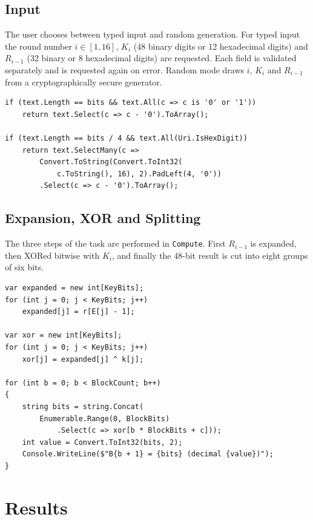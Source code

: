 \documentclass[12pt,a4paper]{article}
\begin{document}
\subsection{Input}

The user chooses between typed input and random generation. For typed input the round number $i\in[1,16]$, $K_i$ (48 binary digits or 12 hexadecimal digits) and $R_{i-1}$ (32 binary or 8 hexadecimal digits) are requested. Each field is validated separately and is requested again on error. Random mode draws $i$, $K_i$ and $R_{i-1}$ from a cryptographically secure generator.

\begin{lstlisting}[style=csharp,caption={Reading bits in binary or hexadecimal form}]
if (text.Length == bits && text.All(c => c is '0' or '1'))
    return text.Select(c => c - '0').ToArray();

if (text.Length == bits / 4 && text.All(Uri.IsHexDigit))
    return text.SelectMany(c =>
        Convert.ToString(Convert.ToInt32(
            c.ToString(), 16), 2).PadLeft(4, '0'))
        .Select(c => c - '0').ToArray();
\end{lstlisting}

\subsection{Expansion, XOR and Splitting}

The three steps of the task are performed in \texttt{Compute}. First $R_{i-1}$ is expanded, then XORed bitwise with $K_i$, and finally the 48-bit result is cut into eight groups of six bits.

\begin{lstlisting}[style=csharp,caption={Core of the computation}]
var expanded = new int[KeyBits];
for (int j = 0; j < KeyBits; j++)
    expanded[j] = r[E[j] - 1];

var xor = new int[KeyBits];
for (int j = 0; j < KeyBits; j++)
    xor[j] = expanded[j] ^ k[j];

for (int b = 0; b < BlockCount; b++)
{
    string bits = string.Concat(
        Enumerable.Range(0, BlockBits)
            .Select(c => xor[b * BlockBits + c]));
    int value = Convert.ToInt32(bits, 2);
    Console.WriteLine($"B{b + 1} = {bits} (decimal {value})");
}
\end{lstlisting}

\newpage
\section{Results}
\end{document}
